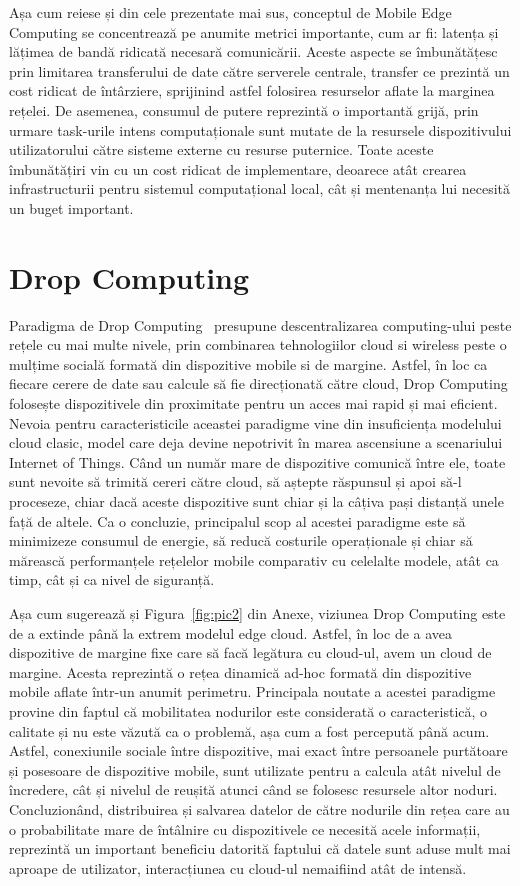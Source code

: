 \documentclass[12pt,a4paper]{report}
\begin{document}
Așa cum reiese și din cele prezentate mai sus, conceptul de Mobile Edge Computing se concentrează pe anumite metrici importante, cum ar fi: latența și lățimea de bandă ridicată necesară comunicării. Aceste aspecte se îmbunătățesc prin limitarea transferului de date către serverele centrale, transfer ce prezintă un cost ridicat de întârziere, sprijinind astfel folosirea resurselor aflate la marginea rețelei. De asemenea, consumul de putere reprezintă o importantă grijă, prin urmare task-urile intens computaționale sunt mutate de la resursele dispozitivului utilizatorului către sisteme externe cu resurse puternice. Toate aceste îmbunătățiri vin cu un cost ridicat de implementare, deoarece atât crearea infrastructurii pentru sistemul computațional local, cât și mentenanța lui necesită un buget important. 

\section{Drop Computing} \label{dropComputing}
Paradigma de Drop Computing~\cite{DC} presupune descentralizarea computing-ului peste rețele cu mai multe nivele, prin combinarea tehnologiilor cloud si wireless peste o mulțime socială formată din dispozitive mobile si de margine. Astfel, în loc ca fiecare cerere de date sau calcule să fie direcționată către cloud, Drop Computing folosește dispozitivele din proximitate pentru un acces mai rapid și mai eficient. Nevoia pentru caracteristicile aceastei paradigme vine din insuficiența modelului cloud clasic, model care deja devine nepotrivit în marea ascensiune a scenariului Internet of Things. Când un număr mare de dispozitive comunică între ele, toate sunt nevoite să trimită cereri către cloud, să aștepte răspunsul și apoi să-l proceseze, chiar dacă aceste dispozitive sunt chiar și la câțiva pași distanță unele față de altele.
Ca o concluzie, principalul scop al acestei paradigme este să minimizeze consumul de energie, să reducă costurile operaționale și chiar să mărească performanțele rețelelor mobile comparativ cu celelalte modele, atât ca timp, cât și ca nivel de siguranță.
	
Așa cum sugerează și Figura~\ref{fig:pic2} din Anexe, viziunea Drop Computing este de a extinde până la extrem modelul edge cloud. Astfel, în loc de a avea dispozitive de margine fixe care să facă legătura cu cloud-ul, avem un cloud de margine. Acesta reprezintă o rețea dinamică ad-hoc formată din dispozitive mobile aflate într-un anumit perimetru. Principala noutate a acestei paradigme provine din faptul că mobilitatea nodurilor este considerată o caracteristică, o calitate și nu este văzută ca o problemă, așa cum a fost percepută până acum. Astfel, conexiunile sociale între dispozitive, mai exact între persoanele purtătoare și posesoare de dispozitive mobile, sunt utilizate pentru a calcula atât nivelul de încredere, cât și nivelul de reușită atunci când se folosesc resursele altor noduri. Concluzionând, distribuirea și salvarea datelor de către nodurile din rețea care au o probabilitate mare de întâlnire cu dispozitivele ce necesită acele informații, reprezintă un important beneficiu datorită faptului că datele sunt aduse mult mai aproape de utilizator, interacțiunea cu cloud-ul nemaifiind atât de intensă.
\end{document}

